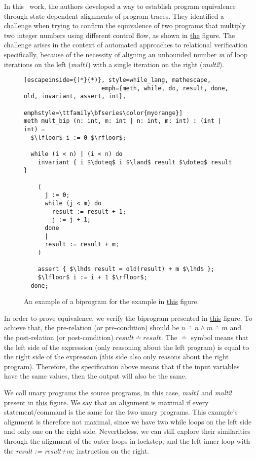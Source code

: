 In this~\cite{DBLP:conf/pldi/ChurchillP0A19} work, the authors developed a way to establish program equivalence through state-dependent alignments of program traces.
They identified a challenge when trying to confirm the equivalence of two programs that multiply two integer numbers using different control flow, as shown in \hyperref[fig:mult_source_programs]{the} figure.
The challenge arises in the context of automated approaches to relational verification specifically, because of the necessity of aligning an unbounded number \emph{m} of loop iterations on the left (\emph{mult1}) with a single iteration on the right (\emph{mult2}).

\begin{figure}[h]
  \centering
  \noindent
  \begin{lstlisting}[escapeinside={(*}{*)}, style=while_lang, mathescape,
                      emph={meth, while, do, result, done, old, invariant, assert, int},
                      emphstyle=\ttfamily\bfseries\color{myorange}]
meth mult_bip (n: int, m: int | n: int, m: int) : (int | int) =
  $\lfloor$ i := 0 $\rfloor$;

  while (i < n) | (i < n) do
    invariant { i $\doteq$ i $\land$ result $\doteq$ result }

    (
      j := 0;
      while (j < m) do
        result := result + 1;
        j := j + 1;
      done
      |
      result := result + m;
    )

    assert { $\lhd$ result = old(result) + m $\lhd$ };
    $\lfloor$ i := i + 1 $\rfloor$;
  done;
  \end{lstlisting}
  \caption{An example of a biprogram for the example in \hyperref[fig:mult_source_programs]{this} figure.}
  \label{fig:mult_biprogram}
\end{figure}

In order to prove equivalence, we verify the biprogram presented in \hyperref[fig:mult_biprogram]{this} figure.
To achieve that, the pre-relation (or pre-condition) should be \(n \doteq n \land m \doteq m \) and the post-relation (or post-condition) \(result \doteq result\).
The $\doteq$ symbol means that the left side of the expression (only reasoning about the left program) is equal to the right side of the expression (this side also only reasons about the right program).
Therefore, the specification above means that if the input variables have the same values, then the output will also be the same.

We call unary programs the source programs, in this case, \emph{mult1} and \emph{mult2} present in \hyperref[fig:mult_source_programs]{this} figure.
We say that an alignment is maximal if every statement/command is the same for the two unary programs.
This example's alignment is therefore not maximal, since we have two while loops on the left side and only one on the right side.
Nevertheless, we can still explore their similarities through the alignment of the outer loops in lockstep, and the left inner loop with the \emph{result := result+m;} instruction on the right.

